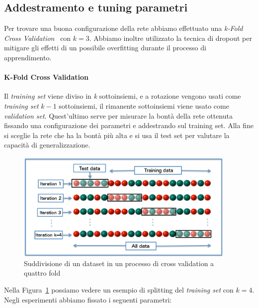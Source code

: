 \documentclass[11pt,a4paper,twoside,
openright]{book}
\begin{document}
\subsection{Addestramento e tuning parametri}
\label{modselmnist}
Per trovare una buona configurazione della rete abbiamo effettuato una \textit{k-Fold Cross Validation}~\cite{Refaeilzadeh2009} con $k=3$. Abbiamo inoltre utilizzato la tecnica di dropout per mitigare gli effetti di un possibile overfitting durante il processo di apprendimento.
\paragraph*{K-Fold Cross Validation}
Il \textit{training set} viene diviso in \textit{k} sottoinsiemi, e a rotazione vengono usati come \textit{training set} $k-1$ sottoinsiemi, il rimanente sottoinsiemi viene usato come \textit{validation set}. Quest'ultimo serve per misurare la bontà della rete ottenuta fissando una configurazione dei parametri e addestrando sul training set. Alla fine si sceglie la rete che ha la bontà più alta e si usa il test set per valutare la capacità di generalizzazione.
\begin{figure}
\begin{center}
\includegraphics[width=300pt]{K-fold_cross_validation_EN.jpg}
\caption{Suddivisione di un dataset in un processo di cross validation a quattro fold~\cite{pict_kfold}}\label{fig:kfold}
\end{center}
\end{figure}
Nella Figura~\ref{fig:kfold} possiamo vedere un esempio di splitting del \textit{training set} con $k=4$.\\
Negli esperimenti abbiamo fissato i seguenti parametri:
\end{document}
